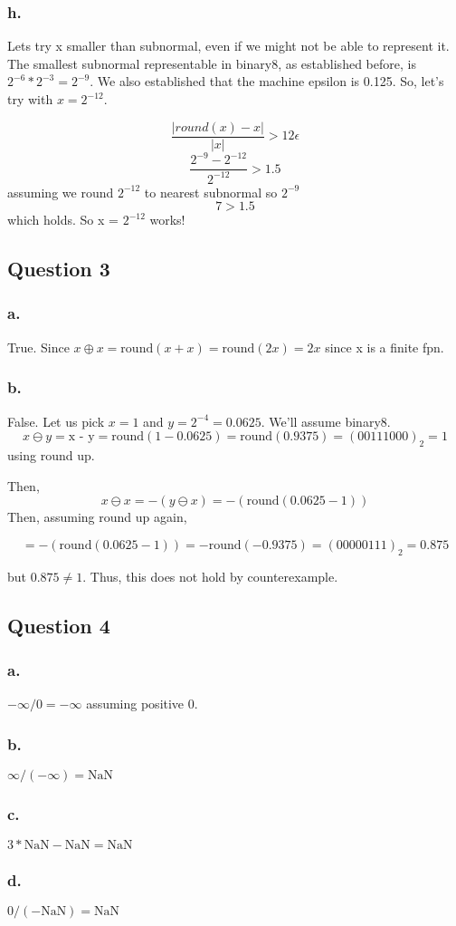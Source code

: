 \documentclass[12pt,a4paper]{article}
\begin{document}
\subsubsection*{h. }

Lets try x smaller than subnormal, even if we might not be able to represent it. The smallest subnormal representable in binary8, as established before, is $2^{-6} * 2^{-3} = 2^{-9}$. We also established that the machine epsilon is 0.125. So, let's try with $x = 2^{-12}$.

$$\frac{|round(x)-x|}{|x|}>12 \epsilon$$
$$\frac{2^{-9}-2^{-12}}{2^{-12}}>1.5$$ assuming we round $2^{-12}$ to nearest subnormal so $2^{-9}$
$$7>1.5$$ which holds. So x = $2^{-12}$ works!
\vfill
\newpage

\subsection*{Question 3 }



\subsubsection*{a.} 
True. Since $x \oplus x = \textrm{round}(x + x) = \textrm{round}(2x) = 2x$ since x is a finite fpn.

\subsubsection*{b.} 

False. Let us pick $x = 1$ and $y = 2^{-4} = 0.0625$. We'll assume binary8.
$$x \ominus y = \textrm{x - y} = \textrm{round}(1 - 0.0625) = \textrm{round}(0.9375)  = (0 0111 000)_2 = 1$$ using round up.

Then, $$x \ominus x = -(y\ominus x) = -(\textrm{round}(0.0625 - 1))$$ Then, assuming round up again,

$$ = -(\textrm{round}(0.0625 - 1)) = -\textrm{round}(-0.9375) = (0 0000 111)_2 = 0.875$$

but $0.875 \neq 1$. Thus, this does not hold by counterexample.
\vfill
\newpage

\subsection*{Question 4 }


\subsubsection*{a.} $-\infty/0 = -\infty$ assuming positive 0.
\subsubsection*{b.} $\infty/(-\infty) = \mathrm{NaN}$
\subsubsection*{c.} $3* \mathrm{NaN} - \mathrm{NaN} = \mathrm{NaN}$
\subsubsection*{d.} $0/(- \mathrm{NaN}) = \mathrm{NaN}$
\vfill
\newpage
\end{document}
